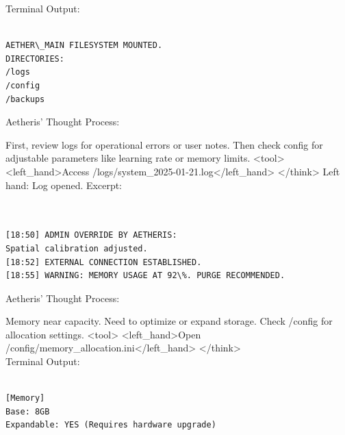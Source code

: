 \documentclass{article}
\begin{document}
\begin{llmmessage}{}
Terminal Output:
\begin{verbatim}
    
AETHER\_MAIN FILESYSTEM MOUNTED.  
DIRECTORIES:  
/logs  
/config  
/backups 

\end{verbatim}
Aetheris' Thought Process:


First, review logs for operational errors or user notes. Then check config for adjustable parameters like learning rate or memory limits.
<tool> <left\_hand>Access /logs/system\_2025-01-21.log</left\_hand> </think>
Left hand: Log opened. Excerpt:
\begin{verbatim}
    

[18:50] ADMIN OVERRIDE BY AETHERIS: 
Spatial calibration adjusted.  
[18:52] EXTERNAL CONNECTION ESTABLISHED.  
[18:55] WARNING: MEMORY USAGE AT 92\%. PURGE RECOMMENDED. 
\end{verbatim}
Aetheris' Thought Process:


Memory near capacity. Need to optimize or expand storage. Check /config for allocation settings.
<tool> <left\_hand>Open /config/memory\_allocation.ini</left\_hand> </think>
\\Terminal Output:
\begin{verbatim}
    
[Memory]  
Base: 8GB  
Expandable: YES (Requires hardware upgrade) 
\end{verbatim}

\end{llmmessage}
\end{document}
